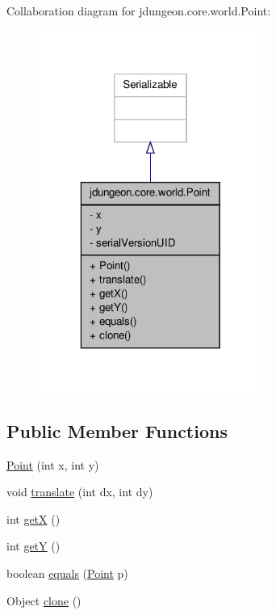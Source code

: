 Collaboration diagram for jdungeon.core.world.Point:
\nopagebreak
\begin{figure}[H]
\begin{center}
\leavevmode
\includegraphics[width=208pt]{classjdungeon_1_1core_1_1world_1_1_point__coll__graph}
\end{center}
\end{figure}
\subsection*{Public Member Functions}
\begin{DoxyCompactItemize}
\item 
\hyperlink{classjdungeon_1_1core_1_1world_1_1_point_a78afc4826a7b3eabcc2207366d923f9d}{Point} (int x, int y)
\item 
void \hyperlink{classjdungeon_1_1core_1_1world_1_1_point_ab451d07d0c8dd33c9c4567a05a0f1337}{translate} (int dx, int dy)
\item 
int \hyperlink{classjdungeon_1_1core_1_1world_1_1_point_ab57fc17d353e829e762fbd8f438fb764}{getX} ()
\item 
int \hyperlink{classjdungeon_1_1core_1_1world_1_1_point_a21edf459bf1c122c03d71070663a8d1b}{getY} ()
\item 
boolean \hyperlink{classjdungeon_1_1core_1_1world_1_1_point_aa0f2daec7774b778d1f9867c739e66ba}{equals} (\hyperlink{classjdungeon_1_1core_1_1world_1_1_point}{Point} p)
\item 
Object \hyperlink{classjdungeon_1_1core_1_1world_1_1_point_a54c980ec3fd2714f41c2310a0f5ef0ba}{clone} ()
\end{DoxyCompactItemize}


